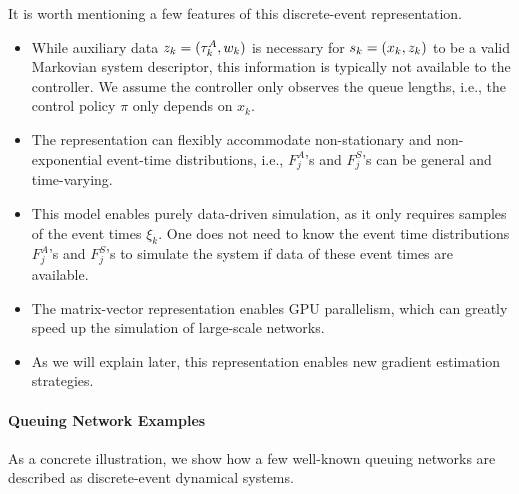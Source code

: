 It is worth mentioning a few features of this discrete-event representation.
\begin{itemize}[itemsep=0pt]
    \item While auxiliary data $z_{k} = (\tau^{A}_{k}, w_{k})$ is necessary for $s_{k} = (x_{k}, z_{k})$ to be a valid Markovian system descriptor, this information is typically not available to the controller. We assume the controller only observes the queue lengths, i.e., the control policy $\pi$ only depends on $x_k$.
    \item The representation can flexibly accommodate non-stationary and non-exponential event-time distributions, i.e., $F_{j}^{A}$'s and $F_{j}^{S}$'s can be general and time-varying.
    \item This model enables purely data-driven simulation, as it only requires samples of the event times $\xi_{k}$. One does not need to know the event time distributions $F_{j}^{A}$'s and $F_{j}^{S}$'s to simulate the system if data of these event times are available.
    \item The matrix-vector representation enables GPU parallelism, which can greatly speed up the simulation of large-scale networks. 
    \item As we will explain later, this representation enables new gradient estimation strategies.
\end{itemize}


\paragraph{Queuing Network Examples}
As a concrete illustration, we show how a few well-known queuing networks are described as discrete-event dynamical systems.
\vspace{1em}



